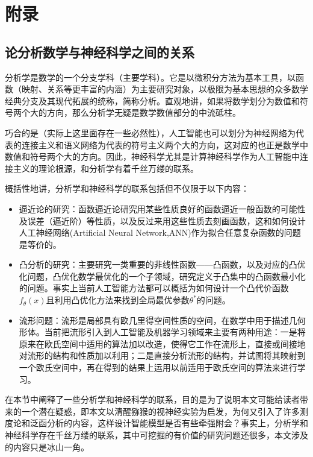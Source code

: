 \appendix
\chapter{附录}

\section{论分析数学与神经科学之间的关系}
分析学是数学的一个分支学科（主要学科）。它是以微积分方法为基本工具，以函数（映射、关系等更丰富的内涵）为主要研究对象，以极限为基本思想的众多数学经典分支及其现代拓展的统称，简称分析。直观地讲，如果将数学划分为数值和符号两个大的方向，那么分析学无疑是数学数值部分的中流砥柱。

巧合的是（实际上这里面存在一些必然性），人工智能也可以划分为神经网络为代表的连接主义和语义网络为代表的符号主义两个大的方向，这对应的也正是数学中数值和符号两个大的方向。因此，神经科学尤其是计算神经科学作为人工智能中连接主义的理论根源，和分析学有着千丝万缕的联系。

概括性地讲，分析学和神经科学的联系包括但不仅限于以下内容：

\begin{itemize}
\item 逼近论的研究：函数逼近论研究用某些性质良好的函数逼近一般函数的可能性及误差（逼近阶）等性质，以及反过来用这些性质去刻画函数，这和如何设计人工神经网络(Artificial Neural Network,ANN)作为拟合任意复杂函数的问题是等价的。
\item 凸分析的研究：主要研究一类重要的非线性函数——凸函数，以及对应的凸优化问题，凸优化数学最优化的一个子领域，研究定义于凸集中的凸函数最小化的问题。事实上当前人工智能方法都可以概括为如何设计一个凸代价函数$f_{\theta}(x)$且利用凸优化方法来找到全局最优参数$\theta^*$的问题。
\item 流形问题：流形是局部具有欧几里得空间性质的空间，在数学中用于描述几何形体。当前把流形引入到人工智能及机器学习领域来主要有两种用途：一是将原来在欧氏空间中适用的算法加以改造，使得它工作在流形上，直接或间接地对流形的结构和性质加以利用；二是直接分析流形的结构，并试图将其映射到一个欧氏空间中，再在得到的结果上运用以前适用于欧氏空间的算法来进行学习。
\end{itemize}

在本节中阐释了一些分析学和神经科学的联系，目的是为了说明本文可能给读者带来的一个潜在疑惑，即本文以清醒猕猴的视神经实验为启发，为何又引入了许多测度论和泛函分析的内容，这样设计智能模型是否有些牵强附会？事实上，分析学和神经科学存在千丝万缕的联系，其中可挖掘的有价值的研究问题还很多，本文涉及的内容只是冰山一角。

